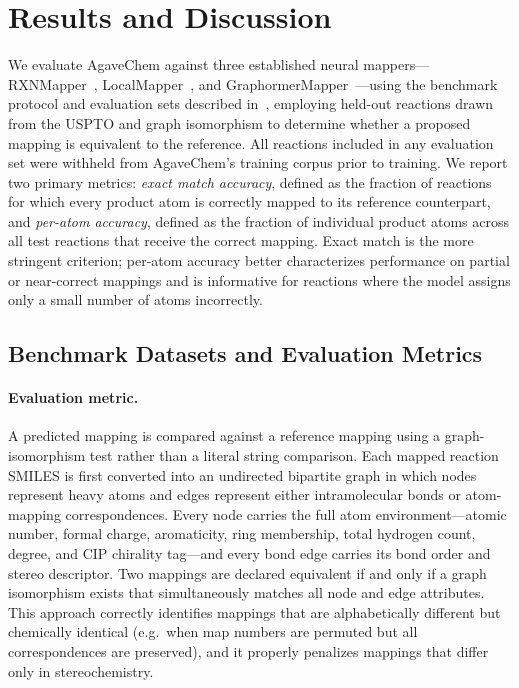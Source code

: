 \documentclass[12pt]{article}
\begin{document}
\section{Results and Discussion}
\label{sec:results}

We evaluate AgaveChem against three established neural
mappers---RXNMapper~\cite{Schwaller2021}, LocalMapper~\cite{Chen2024},
and GraphormerMapper~\cite{Nugmanov2022}---using the benchmark protocol
and evaluation sets described in~\cite{Lin2020,Jaworski2019}, employing
held-out reactions drawn from the USPTO and graph isomorphism
to determine whether a proposed mapping is equivalent to the reference.
All reactions included in any evaluation set were withheld from
AgaveChem's training corpus prior to training.  We report two primary
metrics: \emph{exact match accuracy}, defined as the fraction of
reactions for which every product atom is correctly mapped to its
reference counterpart, and \emph{per-atom accuracy}, defined as the
fraction of individual product atoms across all test reactions that
receive the correct mapping.  Exact match is the more stringent
criterion; per-atom accuracy better characterizes performance on
partial or near-correct mappings and is informative for reactions
where the model assigns only a small number of atoms incorrectly.

\subsection{Benchmark Datasets and Evaluation Metrics}
\label{subsec:benchmark}


\paragraph{Evaluation metric.}
A predicted mapping is compared against a reference mapping using a
graph-isomorphism test rather than a literal string comparison.  Each
mapped reaction SMILES is first converted into an undirected bipartite
graph in which nodes represent heavy atoms and edges represent either
intramolecular bonds or atom-mapping correspondences.  Every node
carries the full atom environment---atomic number, formal charge,
aromaticity, ring membership, total hydrogen count, degree, and CIP
chirality tag---and every bond edge carries its bond order and stereo
descriptor.  Two mappings are declared equivalent if and only if a
graph isomorphism exists that simultaneously matches all node and edge
attributes.  This approach correctly identifies mappings that are
alphabetically different but chemically identical (e.g.\ when map
numbers are permuted but all correspondences are preserved), and it
properly penalizes mappings that differ only in stereochemistry.
\end{document}
